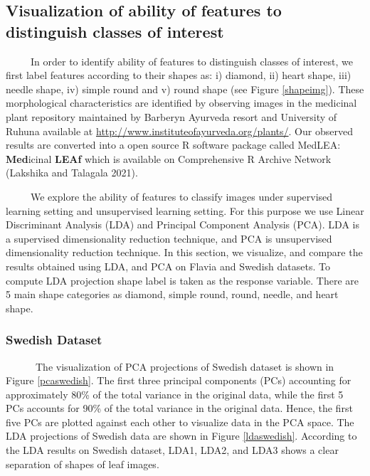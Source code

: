 \documentclass{article}
\begin{document}
\hypertarget{visualization-of-ability-of-features-to-distinguish-classes-of-interest}{%
\subsection{Visualization of ability of features to distinguish classes
of
interest}\label{visualization-of-ability-of-features-to-distinguish-classes-of-interest}}

~~~~~In order to identify ability of features to distinguish classes of
interest, we first label features according to their shapes as: i)
diamond, ii) heart shape, iii) needle shape, iv) simple round and v)
round shape (see Figure \ref{shapeimg}). These morphological
characteristics are identified by observing images in the medicinal
plant repository maintained by Barberyn Ayurveda resort and University
of Ruhuna available at \url{http://www.instituteofayurveda.org/plants/}.
Our observed results are converted into a open source R software package
called MedLEA: \textbf{Med}icinal \textbf{LEAf} which is available on
Comprehensive R Archive Network (Lakshika and Talagala 2021).

~~~~~We explore the ability of features to classify images under
supervised learning setting and unsupervised learning setting. For this
purpose we use Linear Discriminant Analysis (LDA) and Principal
Component Analysis (PCA). LDA is a supervised dimensionality reduction
technique, and PCA is unsupervised dimensionality reduction technique.
In this section, we visualize, and compare the results obtained using
LDA, and PCA on Flavia and Swedish datasets. To compute LDA projection
shape label is taken as the response variable. There are 5 main shape
categories as diamond, simple round, round, needle, and heart shape.

\hypertarget{swedish-dataset}{%
\subsubsection{Swedish Dataset}\label{swedish-dataset}}

~~~~~~The visualization of PCA projections of Swedish dataset is shown
in Figure \ref{pcaswedish}. The first three principal components (PCs)
accounting for approximately 80\% of the total variance in the original
data, while the first 5 PCs accounts for 90\% of the total variance in
the original data. Hence, the first five PCs are plotted against each
other to visualize data in the PCA space. The LDA projections of Swedish
data are shown in Figure \ref{ldaswedish}. According to the LDA results
on Swedish dataset, LDA1, LDA2, and LDA3 shows a clear separation of
shapes of leaf images.
\end{document}
